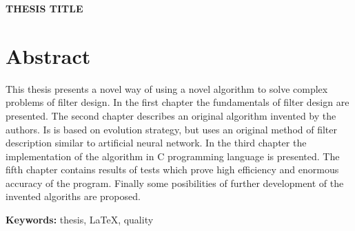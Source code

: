 \vskip 2cm


\begin{center}
\large \bf
THESIS TITLE
\end{center}

\section*{Abstract}
This thesis presents a novel way of using a novel algorithm to solve complex
problems of filter design. In the first chapter the fundamentals of filter design
are presented. The second chapter describes an original algorithm invented by the
authors. Is is based on evolution strategy, but uses an original method of filter
description similar to artificial neural network. In the third chapter the implementation
of the algorithm in C programming language is presented. The fifth chapter contains results
of tests which prove high efficiency and enormous accuracy of the program. Finally some
posibilities of further development of the invented algoriths are proposed.

\bigskip
{\noindent\bf Keywords:} thesis, LaTeX, quality

\vfill